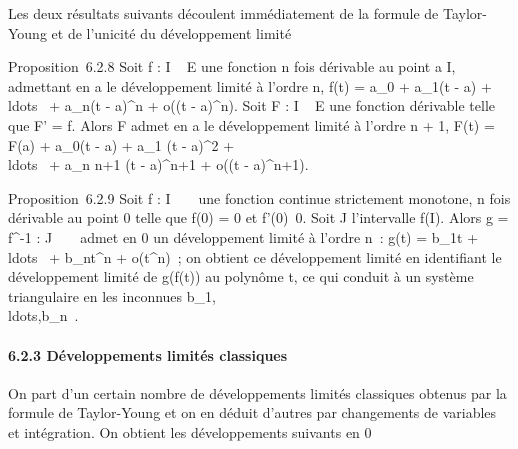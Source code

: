 \documentclass[]{article}
\begin{document}
Les deux résultats suivants découlent immédiatement de la formule de
Taylor-Young et de l'unicité du développement limité

Proposition~6.2.8 Soit f : I \rightarrow~ E une fonction n fois dérivable au point
a \in I, admettant en a le développement limité à l'ordre n, f(t) =
a\_0 + a\_1(t - a) +
\\ldots~ +
a\_n(t - a)^n + o((t - a)^n). Soit F : I \rightarrow~
E une fonction dérivable telle que F' = f. Alors F admet en a le
développement limité à l'ordre n + 1, F(t) = F(a) + a\_0(t - a)
+ a\_1  (t - a)^2 +
\\ldots~ +
a\_n \over n+1 (t - a)^n+1 + o((t
- a)^n+1).

Proposition~6.2.9 Soit f : I \rightarrow~ ~ une fonction continue strictement
monotone, n fois dérivable au point 0 telle que f(0) = 0 et
f'(0)\neq~0. Soit J l'intervalle f(I). Alors g =
f^-1 : J \rightarrow~ ~ admet en 0 un développement limité à l'ordre n~:
g(t) = b\_1t +
\\ldots~ +
b\_nt^n + o(t^n)~; on obtient ce
développement limité en identifiant le développement limité de g(f(t))
au polynôme t, ce qui conduit à un système triangulaire en les inconnues
b\_1,\\ldots,b\_n~.

\paragraph{6.2.3 Développements limités classiques}

On part d'un certain nombre de développements limités classiques obtenus
par la formule de Taylor-Young et on en déduit d'autres par changements
de variables et intégration. On obtient les développements suivants en 0
\end{document}
